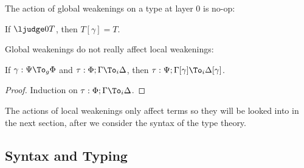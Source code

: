 The action of global weakenings on a type at layer $0$ is no-op:
\begin{lemma}
  If $\ljudge 0 T$, then $T[\gamma] = T$.
\end{lemma}
Global weakenings do not really affect local weakenings:
\begin{lemma}
  If $\gamma : \Psi \To_g \Phi$ and $\tau : \Phi; \Gamma \To_i \Delta$, then $\tau :
  \Psi; \Gamma[\gamma] \To_i \Delta[\gamma]$. 
\end{lemma}
\begin{proof}
  Induction on $\tau : \Phi; \Gamma \To_i \Delta$.
\end{proof}

The actions of local weakenings only affect terms so they will be looked into in the
next section, after we consider the syntax of the type theory.

\subsection{Syntax and Typing}

